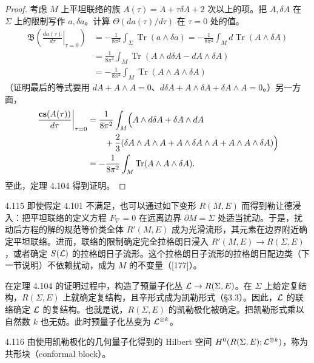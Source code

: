 \begin{proof}
  考虑 $M$ 上平坦联络的族 $A(\tau)=A+\tau\delta A+2\text{ 次以上的项}$。把 $A,\delta A$ 在 $\Sigma$ 上的限制写作 $a,\delta a$。计算 $\Theta(da(\tau)/d\tau)$ 在 $\tau=0$ 处的值。
  \begin{align*}
    \mathfrak{B}\left(\left.\frac{da(\tau)}{d\tau}\right|_{\tau=0}\right)
    &=-\frac{1}{8\pi^2}\int_\Sigma\operatorname{Tr}(a\wedge\delta a)
     =-\frac{1}{8\pi^2}\int_M d\operatorname{Tr}(A\wedge\delta A)\\
    &=\frac{1}{8\pi^2}\int_M\operatorname{Tr}(A\wedge d\delta A-dA\wedge\delta A)\\
    &=-\frac{1}{8\pi^2}\int_M\operatorname{Tr}(A\wedge A\wedge\delta A)
  \end{align*}
  （证明最后的等式要用 $dA+A\wedge A=0$、$d\delta A+A\wedge\delta A+\delta A\wedge A=0$。）另一方面，
  \begin{align*}
    \left.\frac{\mathbf{cs}(A(\tau))}{d\tau}\right|_{\tau=0}
    &=\frac{1}{8\pi^2}\int_M\Bigl(A\wedge d\delta A+\delta A\wedge dA\\
    &\qquad+\frac{2}{3}(\delta A\wedge A\wedge A+A\wedge\delta A\wedge A+A\wedge A\wedge\delta A)\Bigr)\\
    &=-\frac{1}{8\pi^2}\int_M\operatorname{Tr}(A\wedge A\wedge\delta A).
  \end{align*}
  至此，定理 4.104 得到证明。
\end{proof}

\begin{remark}{4.115}
  即使假定 4.101 不满足，也可以通过如下变形 $R(M,E)$ 而得到勒让德浸入：把平坦联络的定义方程 $F_\nabla=0$ 在远离边界 $\partial M=\Sigma$ 处适当扰动。于是，扰动后方程的解的规范等价类全体 $R'(M,E)$ 成为光滑流形，其元素在边界附近确定平坦联络。进而，联络的限制确定完全拉格朗日浸入 $R'(M,E)\to R(\Sigma,E)$，或者确定 $S(\mathcal{L})$ 的拉格朗日子流形。这个拉格朗日子流形的拉格朗日配边类（下一节说明）不依赖扰动，成为 $M$ 的不变量（[177]）。
\end{remark}

在定理 4.104 的证明过程中，构造了预量子化丛 $\mathcal{L}\to R(\Sigma,E)$。在 $\Sigma$ 上给定复结构，$R(\Sigma,E)$ 上就确定复结构，且辛形式成为凯勒形式（§3.3）。因此，$\mathcal{L}$ 的联络确定 $\mathcal{L}$ 的复结构。也就是说，$R(\Sigma,E)$ 的凯勒极化被确定。把凯勒形式乘以自然数 $k$ 也无妨。此时预量子化丛变为 $\mathcal{L}^{\otimes k}$。

\begin{definition}{4.116}
  由使用凯勒极化的几何量子化得到的 Hilbert 空间 $H^0(R(\Sigma,E);\mathcal{L}^{\otimes k})$，称为共形块（conformal block）。
\end{definition}

